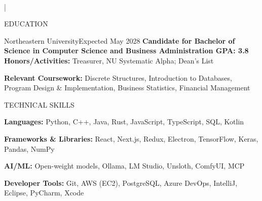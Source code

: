 \documentclass[]{mcdowellcv}
\makeatletter
\renewcommand\makeheader{
  \begin{center}
    {\spaceskip\namespaceskip\relax\textbf{\LARGE\textls[50]{\@name}}}\\[3pt]
    \small\@address{} | \@contacts
  \end{center}
  \vspace*{\afterheaderspace}
}
\makeatother
\begin{document}
\RaggedRight

\makeheader
\vspace{-2.5mm}
\begin{cvsection}{EDUCATION}
	\begin{cvsubsection}{Northeastern University}{}{Expected May 2028}
		\textbf{Candidate for Bachelor of Science in Computer Science and Business Administration \hfill{GPA: 3.8}}
		\textbf{Honors/Activities:} Treasurer, NU Systematic Alpha; Dean's List
		\vspace{-2mm}

		\textbf{Relevant Coursework:} Discrete Structures, Introduction to Databases, Program Design \& Implementation, Business Statistics, Financial Management
	\end{cvsubsection}
\end{cvsection}

\vspace{-2.5mm}
\begin{cvsection}{TECHNICAL SKILLS}
	\begin{cvsubsection}{}{}{}

		\textbf{Languages:} Python, C++, Java, Rust, JavaScript, TypeScript, SQL, Kotlin
		\vspace{-2mm}

		\textbf{Frameworks \& Libraries:} React, Next.js, Redux, Electron, TensorFlow, Keras, Pandas, NumPy
		\vspace{-2mm}

		\textbf{AI/ML:} Open-weight models, Ollama, LM Studio, Unsloth, ComfyUI, MCP
		\vspace{-2mm}

		\textbf{Developer Tools:} Git, AWS (EC2), PostgreSQL, Azure DevOps, IntelliJ, Eclipse, PyCharm, Xcode
	\end{cvsubsection}
\end{cvsection}
\end{document}
